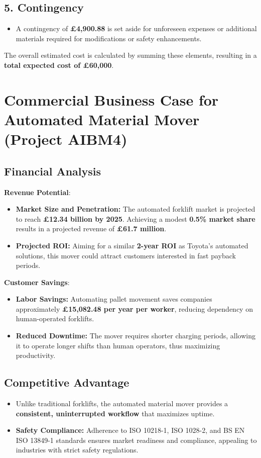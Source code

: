 \documentclass[12pt]{article}
\begin{document}
\subsection*{5. Contingency}
\begin{itemize}
    \item A contingency of \textbf{£4,900.88} is set aside for unforeseen expenses or additional materials required for modifications or safety enhancements.
\end{itemize}

The overall estimated cost is calculated by summing these elements, resulting in a \textbf{total expected cost of £60,000}.

\section*{Commercial Business Case for Automated Material Mover (Project AIBM4)}

\subsection*{Financial Analysis}

\textbf{Revenue Potential}:
\begin{itemize}
    \item \textbf{Market Size and Penetration:} The automated forklift market is projected to reach \textbf{£12.34 billion by 2025}. Achieving a modest \textbf{0.5\% market share} results in a projected revenue of \textbf{£61.7 million}.
    \item \textbf{Projected ROI:} Aiming for a similar \textbf{2-year ROI} as Toyota’s automated solutions, this mover could attract customers interested in fast payback periods.
\end{itemize}

\textbf{Customer Savings}:
\begin{itemize}
    \item \textbf{Labor Savings:} Automating pallet movement saves companies approximately \textbf{£15,082.48 per year per worker}, reducing dependency on human-operated forklifts.
    \item \textbf{Reduced Downtime:} The mover requires shorter charging periods, allowing it to operate longer shifts than human operators, thus maximizing productivity.
\end{itemize}

\subsection*{Competitive Advantage}
\begin{itemize}
    \item Unlike traditional forklifts, the automated material mover provides a \textbf{consistent, uninterrupted workflow} that maximizes uptime.
    \item \textbf{Safety Compliance:} Adherence to ISO 10218-1, ISO 1028-2, and BS EN ISO 13849-1 standards ensures market readiness and compliance, appealing to industries with strict safety regulations.
\end{itemize}
\end{document}
